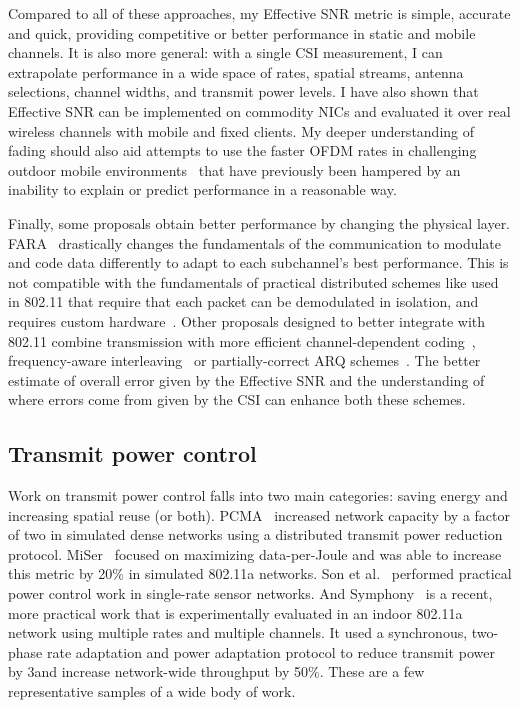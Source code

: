 Compared to all of these approaches, my Effective SNR metric is simple, accurate and quick, providing competitive or better performance in static and mobile channels. It is also more general: with a single CSI measurement, I can extrapolate performance in a wide space of rates, spatial streams, antenna selections, channel widths, and transmit power levels. I have also shown that Effective SNR can be implemented on commodity NICs and evaluated it over real wireless channels with mobile and fixed clients. My deeper understanding of fading should also aid attempts to use the faster OFDM rates in challenging outdoor mobile environments~\cite{Eriksson_Cabernet} that have previously been hampered by an inability to explain or predict performance in a reasonable way.

Finally, some proposals obtain better performance by changing the physical layer. FARA~\cite{Rahul_FARA} drastically changes the fundamentals of the communication to modulate and code data differently to adapt to each subchannel's best performance. This is not compatible with the fundamentals of practical distributed schemes like used in 802.11 that require that each packet can be demodulated in isolation, and requires custom hardware~\cite{Rahul_SWIFT}. Other proposals designed to better integrate with 802.11 combine transmission with more efficient channel-dependent coding~\cite{Lin_ZipTX}, frequency-aware interleaving~\cite{Bhartia_FreqDiv} or partially-correct ARQ schemes~\cite{Jamieson_PPR}. The better estimate of overall error given by the Effective SNR and the understanding of where errors come from given by the CSI can enhance both these schemes.

\subsection{Transmit power control}
Work on transmit power control falls into two main categories: saving energy and increasing spatial reuse (or both). PCMA~\cite{Monks_PowerMAC} increased network capacity by a factor of two in simulated dense networks using a distributed transmit power reduction protocol. MiSer~\cite{Qiao_MiSer} focused on maximizing data-per-Joule and was able to increase this metric by 20\% in simulated 802.11a networks. Son et al.~\cite{Son_PowerStudy} performed practical power control work in single-rate sensor networks. And Symphony~\cite{Ramachandran_Symphony} is a recent, more practical work that is experimentally evaluated in an indoor 802.11a network using multiple rates and multiple channels. It used a synchronous, two-phase rate adaptation and power adaptation protocol to reduce transmit power by 3\dB and increase network-wide throughput by 50\%. These are a few representative samples of a wide body of work.

